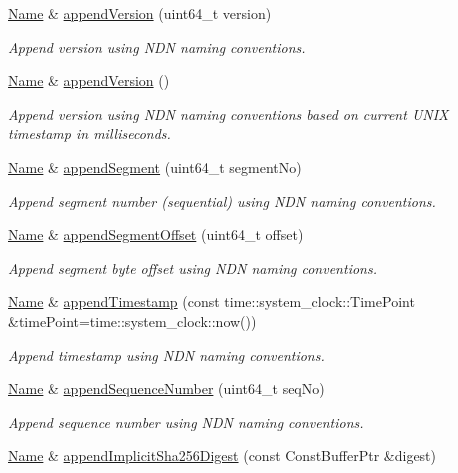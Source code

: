 \begin{DoxyCompactItemize}
\hyperlink{classndn_1_1Name}{Name} \& \hyperlink{classndn_1_1Name_aa901ca3ea5258c9cf5979b08b224ec0e}{append\+Version} (uint64\+\_\+t version)
\begin{DoxyCompactList}\small\item\em Append version using N\+DN naming conventions. \end{DoxyCompactList}\item 
\hyperlink{classndn_1_1Name}{Name} \& \hyperlink{classndn_1_1Name_a4ba9cdee940f2afc2c9a5fc2bcc6d715}{append\+Version} ()
\begin{DoxyCompactList}\small\item\em Append version using N\+DN naming conventions based on current U\+N\+IX timestamp in milliseconds. \end{DoxyCompactList}\item 
\hyperlink{classndn_1_1Name}{Name} \& \hyperlink{classndn_1_1Name_a430e3b734271cfe58541d455211313e0}{append\+Segment} (uint64\+\_\+t segment\+No)
\begin{DoxyCompactList}\small\item\em Append segment number (sequential) using N\+DN naming conventions. \end{DoxyCompactList}\item 
\hyperlink{classndn_1_1Name}{Name} \& \hyperlink{classndn_1_1Name_a8890825e083d90c6ff71125a5f8ddfa4}{append\+Segment\+Offset} (uint64\+\_\+t offset)
\begin{DoxyCompactList}\small\item\em Append segment byte offset using N\+DN naming conventions. \end{DoxyCompactList}\item 
\hyperlink{classndn_1_1Name}{Name} \& \hyperlink{classndn_1_1Name_aac9245d6facbba495ea416dc0cdb2c3d}{append\+Timestamp} (const time\+::system\+\_\+clock\+::\+Time\+Point \&time\+Point=time\+::system\+\_\+clock\+::now())
\begin{DoxyCompactList}\small\item\em Append timestamp using N\+DN naming conventions. \end{DoxyCompactList}\item 
\hyperlink{classndn_1_1Name}{Name} \& \hyperlink{classndn_1_1Name_a4c00781c849feb4a120c1f2362a7e0fa}{append\+Sequence\+Number} (uint64\+\_\+t seq\+No)
\begin{DoxyCompactList}\small\item\em Append sequence number using N\+DN naming conventions. \end{DoxyCompactList}\item 
\hyperlink{classndn_1_1Name}{Name} \& \hyperlink{classndn_1_1Name_a5b6cc06259d2cd32667331a42cf1d7f6}{append\+Implicit\+Sha256\+Digest} (const Const\+Buffer\+Ptr \&digest)\hypertarget{classndn_1_1Name_a5b6cc06259d2cd32667331a42cf1d7f6}{}\label{classndn_1_1Name_a5b6cc06259d2cd32667331a42cf1d7f6}


\end{DoxyCompactItemize}
